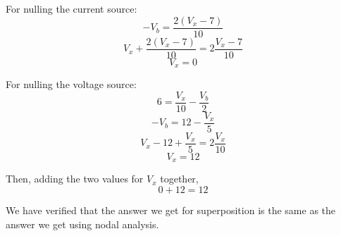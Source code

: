 \begin{enumerate}
{For nulling the current source:
$$-V_b = \frac{2(V_x - 7)}{10}$$
$$V_x + \frac{2(V_x - 7)}{10} = 2\frac{V_x - 7}{10}$$
$$V_x = 0$$

For nulling the voltage source:
$$6 = \frac{V_x}{10} - \frac{V_b}{2}$$
$$-V_b = 12 - \frac{V_x}{5}$$
$$V_x - 12 + \frac{V_x}{5} = 2\frac{V_x}{10}$$
$$V_x = 12$$

Then, adding the two values for $V_x$ together,
$$0 + 12 = 12$$

We have verified that the answer we get for superposition is the same as the answer we get using nodal analysis.

}

\end{enumerate}